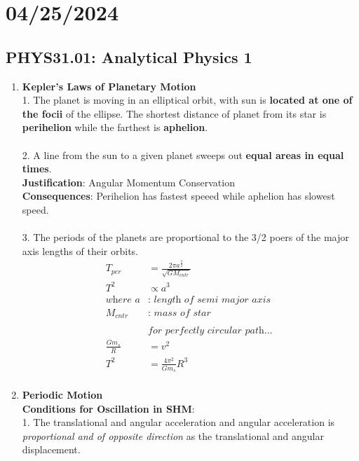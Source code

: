 \documentclass{article}
\begin{document}
\section*{04/25/2024}
\subsection*{PHYS31.01: Analytical Physics 1}
\begin{enumerate}
    \item \textbf{Kepler's Laws of Planetary Motion} \\
    1. The planet is moving in an elliptical orbit, with sun is \textbf{located at one of the focii} of the ellipse. The shortest distance of planet from its star is \textbf{perihelion} while the farthest is \textbf{aphelion}. \\
    \\
    2. A line from the sun to a given planet sweeps out \textbf{equal areas in equal times}. \\
    \textbf{Justification}: Angular Momentum Conservation \\
    \textbf{Consequences}: Perihelion has fastest speeed while aphelion has slowest speed. \\
    \\
    3. The periods of the planets are proportional to the 3/2 poers of the major axis lengths of their orbits. \\
    \begin{align*}
        T_{per}&=\frac{2\pi a^{\frac{3}{2}}}{\sqrt{GM_{cntr}}} \\
        T^2&\propto a^3 \\
        \textit{where }a&:\textit{ length of semi major axis} \\
        M_{cntr}&: \textit{ mass of star} \\
        \\&\textit{for perfectly circular path... }\\
        \frac{Gm_s}{R}&=v^2 \\
        T^2&=\frac{4\pi^2}{Gm_s}R^3 \\
    \end{align*}
    \item \textbf{Periodic Motion} \\
    \textbf{Conditions for Oscillation in SHM}:\\
    1. The translational and angular acceleration and angular acceleration is \textit{proportional and of opposite direction} as the translational and angular displacement. \\

\end{enumerate}
\end{document}
